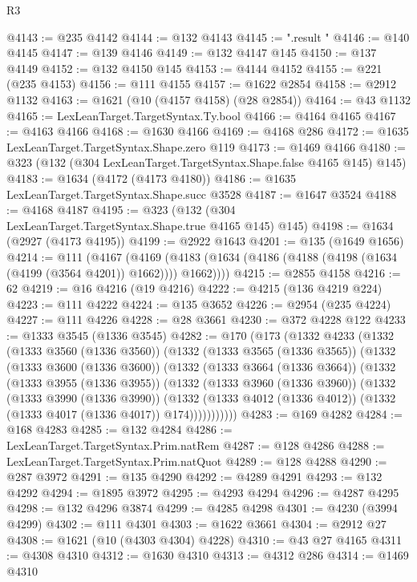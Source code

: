 \begin{lexlean}{R3}
\begin{coremodule}
{{@4143 := @235 @4142
@4144 := @132 @4143
@4145 := ".result }}"
@4146 := @140 @4145
@4147 := @139 @4146
@4149 := @132 @4147 @145
@4150 := @137 @4149
@4152 := @132 @4150 @145
@4153 := @4144 @4152
@4155 := @221 (@235 @4153)
@4156 := @111 @4155
@4157 := @1622 @2854
@4158 := @2912 @1132
@4163 := @1621 (@10 (@4157 @4158) (@28 @2854))
@4164 := @43 @1132
@4165 := LexLeanTarget.TargetSyntax.Ty.bool
@4166 := @4164 @4165
@4167 := @4163 @4166
@4168 := @1630 @4166
@4169 := @4168 @286
@4172 := @1635 LexLeanTarget.TargetSyntax.Shape.zero @119
@4173 := @1469 @4166
@4180 := @323 (@132 (@304 LexLeanTarget.TargetSyntax.Shape.false @4165 @145) @145)
@4183 := @1634 (@4172 (@4173 @4180))
@4186 := @1635 LexLeanTarget.TargetSyntax.Shape.succ @3528
@4187 := @1647 @3524
@4188 := @4168 @4187
@4195 := @323 (@132 (@304 LexLeanTarget.TargetSyntax.Shape.true @4165 @145) @145)
@4198 := @1634 (@2927 (@4173 @4195))
@4199 := @2922 @1643
@4201 := @135 (@1649 @1656)
@4214 := @111
    (@4167
      (@4169 (@4183 (@1634 (@4186 (@4188 (@4198 (@1634 (@4199 (@3564 @4201)) @1662)))) @1662))))
@4215 := @2855 @4158
@4216 := 62
@4219 := @16 @4216 (@19 @4216)
@4222 := @4215 (@136 @4219 @224)
@4223 := @111 @4222
@4224 := @135 @3652
@4226 := @2954 (@235 @4224)
@4227 := @111 @4226
@4228 := @28 @3661
@4230 := @372 @4228 @122
@4233 := @1333 @3545 (@1336 @3545)
@4282 := @170
    (@173
      (@1332
        @4233
        (@1332
          (@1333 @3560 (@1336 @3560))
          (@1332
            (@1333 @3565 (@1336 @3565))
            (@1332
              (@1333 @3600 (@1336 @3600))
              (@1332
                (@1333 @3664 (@1336 @3664))
                (@1332
                  (@1333 @3955 (@1336 @3955))
                  (@1332
                    (@1333 @3960 (@1336 @3960))
                    (@1332
                      (@1333 @3990 (@1336 @3990))
                      (@1332
                        (@1333 @4012 (@1336 @4012))
                        (@1332 (@1333 @4017 (@1336 @4017)) @174)))))))))))
@4283 := @169 @4282
@4284 := @168 @4283
@4285 := @132 @4284
@4286 := LexLeanTarget.TargetSyntax.Prim.natRem
@4287 := @128 @4286
@4288 := LexLeanTarget.TargetSyntax.Prim.natQuot
@4289 := @128 @4288
@4290 := @287 @3972
@4291 := @135 @4290
@4292 := @4289 @4291
@4293 := @132 @4292
@4294 := @1895 @3972
@4295 := @4293 @4294
@4296 := @4287 @4295
@4298 := @132 @4296 @3874
@4299 := @4285 @4298
@4301 := @4230 (@3994 @4299)
@4302 := @111 @4301
@4303 := @1622 @3661
@4304 := @2912 @27
@4308 := @1621 (@10 (@4303 @4304) @4228)
@4310 := @43 @27 @4165
@4311 := @4308 @4310
@4312 := @1630 @4310
@4313 := @4312 @286
@4314 := @1469 @4310

\end{coremodule}
\end{lexlean}
